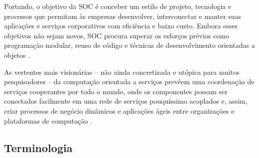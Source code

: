 Portando, o objetivo da SOC é conceber um estilo de projeto, tecnologia e
processos que permitam às empresas desenvolver, interconectar e manter suas
aplicações e serviços corporativos com eficiência e baixo custo. Embora esses
objetivos não sejam novos, SOC procura superar os esforços prévios como
programação modular, reuso de código e técnicas de desenvolvimento orientadas a
objetos \cite{papazoglou2007serviceApprTechRechIss}.

As vertentes mais visionárias -- não ainda concretizada e utópica para muitos
pesquisadores -- da computação orientada a serviços prevêem uma coordenação de
serviços cooperantes por todo o mundo, onde os componentes possam ser conectados
facilmente em uma rede de serviços pouquíssimo acoplados e, assim, criar
processos de negócio dinâmicos e aplicações ágeis entre organizações e plataformas de
computação \cite{leymann2005combining}.


\subsection{Terminologia}
\vspace{-6mm}


